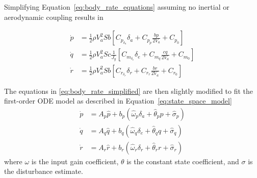 Simplifying Equation~\ref{eq:body_rate_equations} assuming no inertial or aerodynamic coupling results in

\begin{equation}\label{eq:body_rate_simplified}
\begin{split}
 \dot{p}&=\frac{1}{2}\rho V_a^2Sb\left[C_{p_{\delta_a}}\delta_a+C_{p_p}\frac{bp}{2V_a}+C_{p_0}\right]\\
 \dot{q}&=\frac{1}{2}\rho V_a^2Sc\frac{1}{J_y}\left[C_{m_{\delta_e}}\delta_e+C_{m_q}\frac{cq}{2V_a}+C_{m_0}\right]\\
 \dot{r}&=\frac{1}{2}\rho V_a^2Sb\left[C_{r_{\delta_r}}\delta_r+C_{r_r}\frac{br}{2V_a}+C_{r_0}\right]
\end{split} 
\end{equation}

The equations in \ref{eq:body_rate_simplified} are then slightly modified to fit the first-order \ac{ODE} model as described in Equation~\ref{eq:state_space_model}
\begin{equation}\label{eq:simplified_ac_model}
\begin{split}
\dot{p}&=A_p\hat{p}+b_p\left(\hat{\omega}_p\delta_a+\hat{\theta}_pp+\hat{\sigma}_p\right)\\
\dot{q}&=A_q\hat{q}+b_q\left(\hat{\omega}_q\delta_e+\hat{\theta}_qq+\hat{\sigma}_q\right)\\
\dot{r}&=A_r\hat{r}+b_r\left(\hat{\omega}_r\delta_r+\hat{\theta}_rr+\hat{\sigma}_r\right)
\end{split}
\end{equation}
where $\omega$ is the input gain coefficient, $\theta$ is the constant state coefficient, and $\sigma$ is the disturbance estimate.


